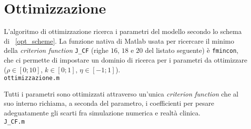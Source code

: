 \section{Ottimizzazione}\label{sec:ottimizzazione}
L'algoritmo di ottimizzazione ricerca i parametri del modello secondo lo schema di \figurename~\ref{opt_scheme}. La funzione nativa di Matlab usata per ricercare il minimo della \textit{criterion function} \verb|J_CF| (righe $16$, $18$ e $20$ del listato seguente) è \verb|fmincon|, che ci permette di impostare un dominio di ricerca per i parametri da ottimizzare ($\rho \in [0;10]$, $k \in [0;1]$, $\eta \in [-1;1]$).\\
\newline
\verb|ottimizzazione.m|

\vspace{10pt}
Tutti i parametri sono ottimizzati attraverso un'unica \textit{criterion function} che al suo interno richiama, a seconda del parametro, i coefficienti per pesare adeguatamente gli scarti fra simulazione numerica e realtà clinica.\\
\newline
\verb|J_CF.m|
